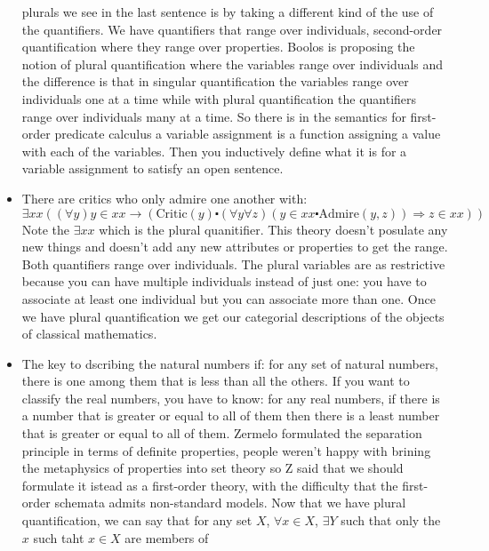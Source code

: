 \documentclass[12pt]{article}
\theoremstyle{definition}
\begin{document}
\begin{itemize}
        plurals we see in the last sentence is by taking a different kind of
        the use of the quantifiers. We have quantifiers that range over
        individuals, second-order quantification where they range over
        properties. Boolos is proposing the notion of plural quantification
        where the variables range over individuals and the difference is that
        in singular quantification the variables range over individuals one at
        a time while with plural quantification the quantifiers range over
        individuals many at a time. So there is in the semantics for
        first-order predicate calculus a variable assignment is a function
        assigning a value with each of the variables. Then you inductively
        define what it is for a variable assignment to satisfy an open
        sentence. 
    \item
        There are critics who only admire one another with: $$\exists xx
        ((\forall y)y \in xx \rightarrow (\mathrm{Critic}(y) \centerdot
        (\forall y \forall z) (y \in xx \centerdot \mathrm{Admire}(y, z))
        \Rightarrow z \in xx))$$ Note the $\exists xx$ which is the plural
        quanitifier. This theory doesn't posulate any new things and doesn't
        add any new attributes or properties to get the range. Both quantifiers
        range over individuals. The plural variables are as restrictive because
        you can have multiple individuals instead of just one: you have to
        associate at least one individual but you can associate more than one.
        Once we have plural quantification we get our categorial descriptions
        of the objects of classical mathematics. 
    \item
        The key to dscribing the natural numbers if: for any set of natural
        numbers, there is one among them that is less than all the others. If
        you want to classify the real numbers, you have to know: for any real
        numbers, if there is a number that is greater or equal to all of them
        then there is a least number that is greater or equal to all of them.
        Zermelo formulated the separation principle in terms of definite
        properties, people weren't happy with brining the metaphysics of
        properties into set theory so Z said that we should formulate it istead
        as a first-order theory, with the difficulty that the first-order
        schemata admits non-standard models. Now that we have plural
        quantification, we can say that for any set $X$, $\forall x \in X$,
        $\exists Y$ such that only the $x$ such taht $x \in X$ are members of

\end{itemize}
\end{document}
